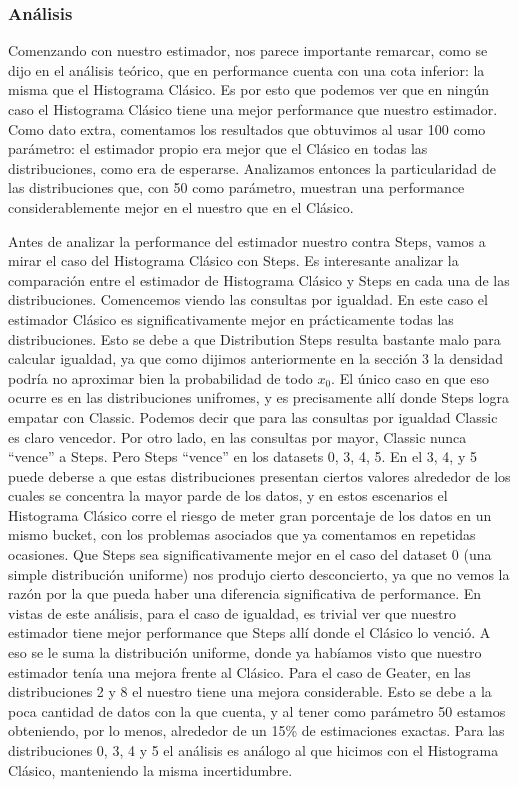 \subsubsection*{Análisis}
Comenzando con nuestro estimador, nos parece importante remarcar, como se dijo en el análisis teórico, que en performance cuenta con una cota inferior: la misma que el Histograma Clásico. Es por esto que podemos ver que en ningún caso el Histograma Clásico tiene una mejor performance que nuestro estimador. Como dato extra, comentamos los resultados que obtuvimos al usar 100 como parámetro: el estimador propio era mejor que el Clásico en todas las distribuciones, como era de esperarse.
Analizamos entonces la particularidad de las distribuciones que, con 50 como parámetro, muestran una performance considerablemente mejor en el nuestro que en el Clásico. 

Antes de analizar la performance del estimador nuestro contra Steps, vamos a mirar el caso del Histograma Clásico con Steps. 
Es interesante analizar la comparación entre el estimador de Histograma Clásico y Steps en cada una de las distribuciones. Comencemos viendo las consultas por igualdad. En este caso el estimador Clásico es significativamente mejor en prácticamente todas las distribuciones. Esto se debe a que Distribution Steps resulta bastante malo para calcular igualdad, ya que como dijimos anteriormente en la sección 3 la densidad podría no aproximar bien la probabilidad de todo $x_0$. El único caso en que eso ocurre es en las distribuciones unifromes, y es precisamente allí donde Steps logra empatar con Classic. Podemos decir que para las consultas por igualdad Classic es claro vencedor.
Por otro lado, en las consultas por mayor, Classic nunca ``vence'' a Steps. Pero Steps ``vence'' en los datasets 0, 3, 4, 5. En el 3, 4, y 5 puede deberse a que estas distribuciones presentan ciertos valores alrededor de los cuales se concentra la mayor parde de los datos, y en estos escenarios el Histograma Clásico corre el riesgo de meter gran porcentaje de los datos en un mismo bucket, con los problemas asociados que ya comentamos en repetidas ocasiones. Que Steps sea significativamente mejor en el caso del dataset 0 (una simple distribución uniforme) nos produjo cierto desconcierto, ya que no vemos la razón por la que pueda haber una diferencia significativa de performance.
En vistas de este análisis, para el caso de igualdad, es trivial ver que nuestro estimador tiene mejor performance que Steps allí donde el Clásico lo venció. A eso se le suma la distribución uniforme, donde ya habíamos visto que nuestro estimador tenía una mejora frente al Clásico.
Para el caso de Geater, en las distribuciones 2 y 8 el nuestro tiene una mejora considerable. Esto se debe a la poca cantidad de datos con la que cuenta, y al tener como parámetro 50 estamos obteniendo, por lo menos, alrededor de un 15\% de estimaciones exactas. Para las distribuciones 0, 3, 4 y 5 el análisis es análogo al que hicimos con el Histograma Clásico, manteniendo la misma incertidumbre.


